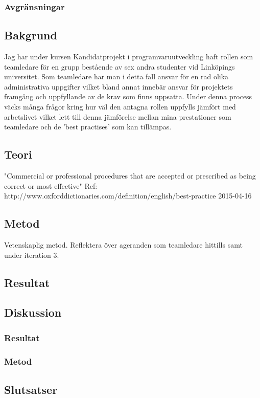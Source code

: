 \subsubsection{Avgränsningar}

\subsection{Bakgrund}
Jag har under kursen Kandidatprojekt i programvaruutveckling haft rollen som teamledare för en grupp bestående av sex andra studenter vid Linköpings universitet. Som teamledare har man i detta fall ansvar för en rad olika administrativa uppgifter vilket bland annat innebär ansvar för projektets framgång och uppfyllande av de krav som finns uppsatta. 
\newline \newline
Under denna process väcks många frågor kring hur väl den antagna rollen uppfylls jämfört med arbetslivet vilket lett till denna jämförelse mellan mina prestationer som teamledare och de 'best practises' som kan tillämpas.

\subsection{Teori}
"Commercial or professional procedures that are accepted or prescribed as being correct or most effective"
\newline \newline
Ref: http://www.oxforddictionaries.com/definition/english/best-practice 2015-04-16

\subsection{Metod}
Vetenskaplig metod. Reflektera över ageranden som teamledare hittills samt under iteration 3.

\subsection{Resultat}

\subsection{Diskussion}

\subsubsection{Resultat}

\subsubsection{Metod}

\subsection{Slutsatser}
